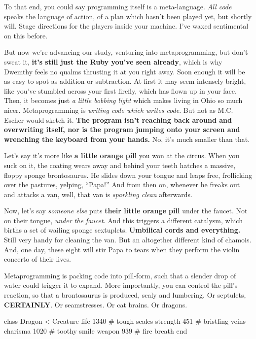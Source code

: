 \documentclass[12pt,twoside]{report}
\begin{document}
To that end, you could say programming itself is a meta-language.
{\em All code} speaks the language of action, of a plan which hasn't
been played yet, but shortly will.  Stage directions for the players
inside your machine.  I've waxed sentimental on this before.

But now we're advancing our study, venturing into metaprogramming, but
don't sweat it, {\bf it's still just the Ruby you've seen already},
which is why Dwemthy feels no qualms thrusting it at you right away.
Soon enough it will be as easy to spot as addition or subtraction.  At
first it may seem intensely bright, like you've stumbled across your
first firefly, which has flown up in your face.  Then, it becomes just
{\em a little bobbing light} which makes living in Ohio so much nicer.
Metaprogramming is {\em writing code which writes code}.  But not as
M.C. Escher would sketch it.  {\bf The program isn't reaching back
  around and overwriting itself, nor is the program jumping onto your
  screen and wrenching the keyboard from your hands.}  No, it's much
smaller than that.

Let's say it's more like {\bf a little orange pill} you won at the
circus.  When you suck on it, the coating wears away and behind your
teeth hatches a massive, floppy sponge brontosaurus.  He slides down
your tongue and leaps free, frollicking over the pastures, yelping,
``Papa!''  And from then on, whenever he freaks out and attacks a van,
well, that van is {\em sparkling clean} afterwards.

Now, let's say {\em someone else} puts {\bf their little orange pill}
under the faucet.  Not on their tongue, {\em under the faucet}.  And
this triggers a different catalysm, which births a set of wailing
sponge sextuplets.  {\bf Umbilical cords and everything.}  Still very
handy for cleaning the van. But an altogether different kind of
chamois.  And, one day, these eight will stir Papa to tears when they
perform the violin concerto of their lives.

Metaprogramming is packing code into pill-form, such that a slender
drop of water could trigger it to expand. More importantly, you can
control the pill's reaction, so that a brontosaurus is produced, scaly
and lumbering. Or septulets, {\bf CERTAINLY}.  Or seamstresses.  Or
cat brains.  Or dragons.


\begin{rubycode}

 class Dragon < Creature
   life 1340     # tough scales
   strength 451  # bristling veins
   charisma 1020 # toothy smile
   weapon 939    # fire breath
 end

\end{rubycode}
\end{document}
